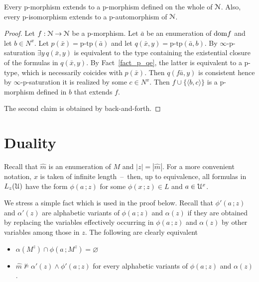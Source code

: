 

\begin{fact}\label{fact_phogeneity}
  Every p-morphism extends to a p-morphism defined on the whole of $\EuScript N$.
  Also, every p-isomorphism extends to a p-automorphism of $\EuScript N$.
\end{fact}

\begin{proof}
  Let $f:\EuScript N\to\EuScript N$ be a p-morphism.
  Let $\bar a$ be an enumeration of ${\rm dom} f$ and let $b\in N^x$.
  Let $p(\bar x)=\textrm{p-tp}(\bar a)$ and let $q(\bar x,y)=\textrm{p-tp}(\bar a,b)$.
  By $\infty$-p-saturation $\exists y\,q(\bar x,y)$ is equivalent to the type containing the existential closure of the formulas in $q(\bar x,y)$.
  By Fact~\ref{fact_p_qe}, the latter is equivalent to a p-type, which is necessarily coicides with $p(\bar x)$.
  Then $q(f\bar a,y)$ is consistent hence by $\infty$-p-saturation it is realized by some $c\in N^x$.
  Then $f\cup\{\langle b,c\rangle\}$ is a p-morphism defined in $b$ that extends $f$.

  The second claim is obtained by back-and-forth.
\end{proof}

\section{Duality}

Recall that $\hat m$ is an enumeration of $M$ and $|z|=|\hat m|$.
For a more convenient notation, $x$ is taken of infinite length~--~then, up to equivalence, all formulas in $L_z(\EuScript U)$ have the form $\phi(a\,;z)$ for some $\phi(x\,;z)\in L$ and $a\in\EuScript U^x$.

\begin{remark}
  We stress a simple fact which is used in the proof below. 
  Recall that $\phi'(a\,;z)$ and $\alpha'(z)$ are alphabetic variants of $\phi(a\,;z)$ and $\alpha(z)$ if they are obtained by replacing the variables effectively occurring in $\phi(a\,;z)$ and $\alpha(z)$ by other variables among those in $z$.
  The following are clearly equivalent
  \begin{itemize}
    \item[1.] $\alpha(M^z)\cap\phi(a\,;M^z)=\varnothing$
    \item[2.] $\hat m\not\models\alpha'(z)\wedge\phi'(a\,;z)$ for every alphabetic variants of $\phi(a\,;z)$ and $\alpha(z)$ .
  \end{itemize}
\end{remark} 

